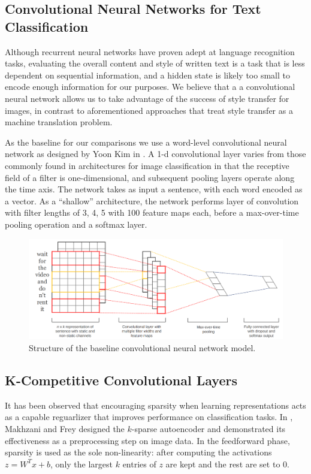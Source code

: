 \documentclass{vldb}
\begin{document}
\subsection{Convolutional Neural Networks for Text Classification}
Although recurrent neural networks have proven adept at language recognition tasks, evaluating the overall content and style of written text is a task that is less dependent on sequential information, and a hidden state is likely too small to encode enough information for our purposes. We believe that a a convolutional neural network allows us to take advantage of the success of style transfer for images, in contrast to aforementioned approaches that treat style transfer as a machine translation problem.

As the baseline for our comparisons we use a word-level convolutional neural network as designed by Yoon Kim in \cite{Kim14f}. A 1-d convolutional layer varies from those commonly found in architectures for image classification in that the receptive field of a filter is one-dimensional, and subsequent pooling layers operate along the time axis. The network takes as input a sentence, with each word encoded as a vector. As a ``shallow'' architecture, the network performs layer of convolution with filter lengths of 3, 4, 5 with 100 feature maps each, before a max-over-time pooling operation and a softmax layer. 

\begin{figure}[h]
\includegraphics[width=\linewidth]{cnn.png}
\caption{\textmd{Structure of the baseline convolutional neural network model.}}
\end{figure}

\subsection{K-Competitive Convolutional Layers}
It has been observed that encouraging sparsity when learning representations acts as a capable reguarlizer that improves performance on classification tasks. In \cite{MakhzaniF13}, Makhzani and Frey designed the $k$-sparse autoencoder and demonstrated its effectiveness as a preprocessing step on image data. In the feedforward phase, sparsity is used as the sole non-linearity: after computing the activations $z = W^Tx + b$, only the largest $k$ entries of $z$ are kept and the rest are set to 0. 
\end{document}
